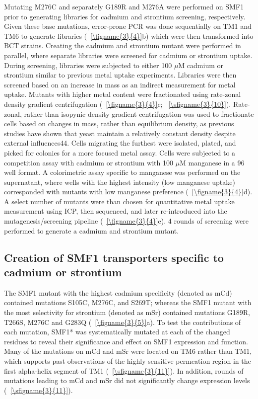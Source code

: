 \documentclass[../main/main]{subfiles}
\begin{document}
Mutating M276C and separately G189R and M276A were performed on SMF1 prior to generating libraries for cadmium and strontium screening, respectively. Given these base mutations, error-prone PCR was done sequentially on TM1 and TM6 to generate libraries (\FIGURE~\ref{\figname{3}{4}}b) which were then transformed into BCT strains. Creating the cadmium and strontium mutant were performed in parallel, where separate libraries were screened for cadmium or strontium uptake. During screening, libraries were subjected to either 100 $\mu$M cadmium or strontium similar to previous metal uptake experiments. Libraries were then screened based on an increase in mass as an indirect measurement for metal uptake. Mutants with higher metal content were fractionated using rate-zonal density gradient centrifugation (\FIGURE~\ref{\figname{3}{4}}c; \sFIGURE~\ref{\sfigname{3}{10}}). Rate-zonal, rather than isopynic density gradient centrifugation was used to fractionate cells based on changes in mass, rather than equilibrium density, as previous studies have shown that yeast maintain a relatively constant density despite external influences44. Cells migrating the furthest were isolated, plated, and picked for colonies for a more focused metal assay. Cells were subjected to a competition assay with cadmium or strontium with 100 $\mu$M manganese in a 96 well format. A colorimetric assay specific to manganese was performed on the supernatant, where wells with the highest intensity (low manganese uptake) corresponded with mutants with low manganese preference (\FIGURE~\ref{\figname{3}{4}}d).
A select number of mutants were than chosen for quantitative metal uptake measurement using ICP, then sequenced, and later re-introduced into the mutagenesis/screening pipeline (\FIGURE~\ref{\figname{3}{4}}e). 4 rounds of screening were performed to generate a cadmium and strontium mutant.

\subsection{Creation of SMF1 transporters specific to cadmium or strontium}
The SMF1 mutant with the highest cadmium specificity (denoted as mCd) contained mutations S105C, M276C, and S269T; whereas the SMF1 mutant with the most selectivity for strontium (denoted as mSr) contained mutations G189R, T266S, M276C and G283Q (\FIGURE~\ref{\figname{3}{5}}a). To test the contributions of each mutation, SMF1* was systematically mutated at each of the changed residues to reveal their significance and effect on SMF1 expression and function. Many of the mutations on mCd and mSr were located on TM6 rather than TM1, which supports past observations of the highly sensitive permeation region in the first alpha-helix segment of TM1 (\sFIGURE~\ref{\sfigname{3}{11}}). In addition, rounds of mutations leading to mCd and mSr did not significantly change expression levels (\sFIGURE~\ref{\sfigname{3}{11}}).
\end{document}
